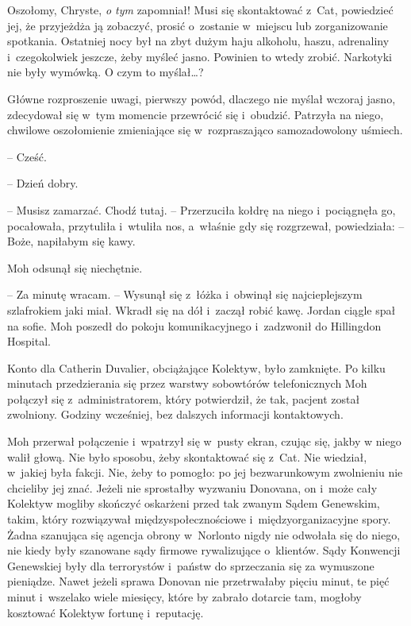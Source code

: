 \documentclass[oneside,polish,11pt,sfheadings]{mwbk}
\begin{document}
Oszołomy, Chryste, \emph{o tym} zapomniał! Musi się skontaktować z~Cat,
powiedzieć jej, że przyjeżdża ją zobaczyć, prosić o~zostanie w~miejscu
lub zorganizowanie spotkania. Ostatniej nocy był na zbyt dużym haju
alkoholu, haszu, adrenaliny i~czegokolwiek jeszcze, żeby myśleć jasno.
Powinien to wtedy zrobić. Narkotyki nie były wymówką. O czym to
myślał\ldots ?

Główne rozproszenie uwagi, pierwszy powód, dlaczego nie myślał wczoraj
jasno, zdecydował się w~tym momencie przewrócić się i~obudzić. Patrzyła
na niego, chwilowe oszołomienie zmieniające się w~rozpraszająco
samozadowolony uśmiech.

-- Cześć.

-- Dzień dobry.

-- Musisz zamarzać. Chodź tutaj. -- Przerzuciła kołdrę na niego i~pociągnęła go, pocałowała, przytuliła i~wtuliła nos, a~właśnie gdy się
rozgrzewał, powiedziała: -- Boże, napiłabym się kawy.

Moh odsunął się niechętnie. 

-- Za minutę wracam. -- Wysunął się z~łóżka i~obwinął się najcieplejszym szlafrokiem jaki miał. Wkradł się na dół i~zaczął robić kawę. Jordan ciągle spał na sofie. Moh poszedł do pokoju
komunikacyjnego i~zadzwonił do Hillingdon Hospital.

Konto dla Catherin Duvalier, obciążające Kolektyw, było zamknięte. Po
kilku minutach przedzierania się przez warstwy sobowtórów telefonicznych
Moh połączył się z~administratorem, który potwierdził, że tak, pacjent
został zwolniony. Godziny wcześniej, bez dalszych informacji
kontaktowych.

Moh przerwał połączenie i~wpatrzył się w~pusty ekran, czując się, jakby
w niego walił głową. Nie było sposobu, żeby skontaktować się z~Cat. Nie
wiedział, w~jakiej była fakcji. Nie, żeby to pomogło: po jej
bezwarunkowym zwolnieniu nie chcieliby jej znać. Jeżeli nie sprostałby
wyzwaniu Donovana, on i~może cały Kolektyw mogliby skończyć oskarżeni
przed tak zwanym Sądem Genewskim, takim, który rozwiązywał
międzyspołecznościowe i~międzyorganizacyjne spory. Żadna szanująca się
agencja obrony w~Norlonto nigdy nie odwołała się do niego, nie kiedy
były szanowane sądy firmowe rywalizujące o~klientów. Sądy Konwencji
Genewskiej były dla terrorystów i~państw do sprzeczania się za wymuszone
pieniądze. Nawet jeżeli sprawa Donovan nie przetrwałaby pięciu minut, te
pięć minut i~wszelako wiele miesięcy, które by zabrało dotarcie tam,
mogłoby kosztować Kolektyw fortunę i~reputację.
\end{document}
